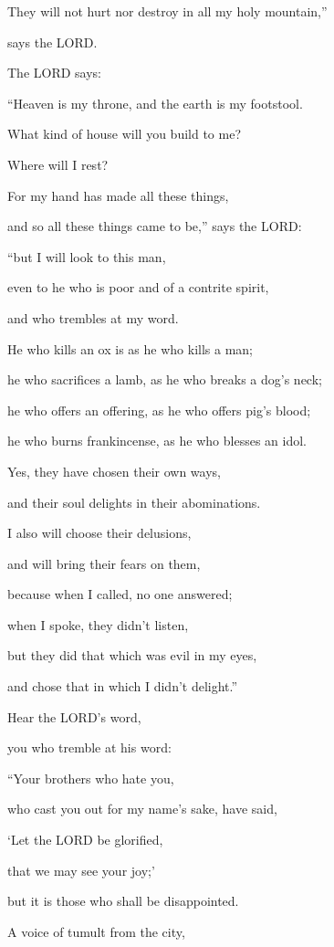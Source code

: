 They will not hurt nor destroy in all my holy mountain,”

says the LORD.


\mychapter \myverse*{}The LORD says:

\quad\quad “Heaven is my throne, and the earth is my footstool.

What kind of house will you build to me?

Where will I rest?

\myverse{}For my hand has made all these things,

and so all these things came to be,” says the LORD:

“but I will look to this man,

even to he who is poor and of a contrite spirit,

and who trembles at my word.

\myverse{}He who kills an ox is as he who kills a man;

he who sacrifices a lamb, as he who breaks a dog’s neck;

he who offers an offering, as he who offers pig’s blood;

he who burns frankincense, as he who blesses an idol.

Yes, they have chosen their own ways,

and their soul delights in their abominations.

\myverse{}I also will choose their delusions,

and will bring their fears on them,

because when I called, no one answered;

when I spoke, they didn’t listen,

but they did that which was evil in my eyes,

and chose that in which I didn’t delight.”


\vspace{\baselineskip} \myverse{}Hear the LORD’s word,

you who tremble at his word:

“Your brothers who hate you,

who cast you out for my name’s sake, have said,

‘Let the LORD be glorified,

that we may see your joy;’

but it is those who shall be disappointed.

\myverse{}A voice of tumult from the city,

